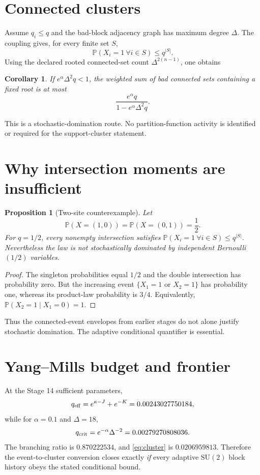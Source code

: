 \documentclass[11pt]{article}
\newtheorem{proposition}[theorem]{Proposition}
\newtheorem{corollary}[theorem]{Corollary}
\begin{document}
\section{Connected clusters}

Assume $q_i\leq q$ and the bad-block adjacency graph has maximum degree
$\Delta$.  The coupling gives, for every finite set $S$,
\[
 \mathbb P(X_i=1\ \forall i\in S)\leq q^{|S|}.
\]
Using the declared rooted connected-set count
$\Delta^{2(n-1)}$, one obtains
\begin{corollary}
If $e^\alpha\Delta^2q<1$, the weighted sum of bad connected sets containing a
fixed root is at most
\begin{equation}
 \frac{e^\alpha q}{1-e^\alpha\Delta^2q}.
 \label{eq:cluster}
\end{equation}
\end{corollary}

This is a stochastic-domination route.  No partition-function activity is
identified or required for the support-cluster statement.

\section{Why intersection moments are insufficient}

\begin{proposition}[Two-site counterexample]
Let
\[
 \mathbb P(X=(1,0))=\mathbb P(X=(0,1))=\frac12.
\]
For $q=1/2$, every nonempty intersection satisfies
$\mathbb P(X_i=1\ \forall i\in S)\leq q^{|S|}$.  Nevertheless the law is not
stochastically dominated by independent Bernoulli$(1/2)$ variables.
\end{proposition}
\begin{proof}
The singleton probabilities equal $1/2$ and the double intersection has
probability zero.  But the increasing event $\{X_1=1\text{ or }X_2=1\}$ has
probability one, whereas its product-law probability is $3/4$.  Equivalently,
$\mathbb P(X_2=1\mid X_1=0)=1$.
\end{proof}

Thus the connected-event envelopes from earlier stages do not alone justify
stochastic domination.  The adaptive conditional quantifier is essential.

\section{Yang--Mills budget and frontier}

At the Stage 14 sufficient parameters,
\[
 q_{\rm eff}=e^{\kappa-J}+e^{-K}=0.00243027750184,
\]
while for $\alpha=0.1$ and $\Delta=18$,
\[
 q_{\rm crit}=e^{-\alpha}\Delta^{-2}=0.00279270808036.
\]
The branching ratio is $0.870222534$, and \eqref{eq:cluster} is
$0.0206959813$.  Therefore the event-to-cluster conversion closes exactly
\emph{if} every adaptive $\mathrm{SU}(2)$ block history obeys the stated
conditional bound.
\end{document}

